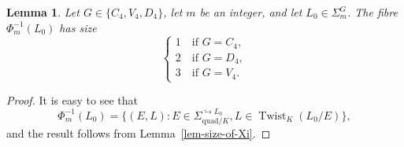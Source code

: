 \documentclass[11pt]{amsart}
\theoremstyle{theorem}
\newtheorem{lemma}[theorem]{Lemma}
\theoremstyle{example}
\theoremstyle{definition}
\numberwithin{theorem}{section}
\numberwithin{theorem}{section}
\DeclareMathOperator{\Twist}{Twist}
\newcommand{\quadr}{\mathrm{quad}}
\begin{document}
\begin{lemma}
    \label{lem-size-of-fibre-of-Phi_m}
    Let $G \in \{C_4, V_4, D_4\}$, let $m$ be an integer, and let $L_0 \in \Sigma_m^G$. The fibre $\Phi_m^{-1}(L_0)$ has size 
    $$
    \begin{cases}
        1\quad\text{if $G = C_4$},
        \\
        2\quad\text{if $G = D_4$},
        \\
        3 \quad\text{if $G = V_4$}. 
    \end{cases}
    $$
\end{lemma}
\begin{proof}
    It is easy to see that 
    $$
    \Phi_m^{-1}(L_0) = \{(E,L) : E \in \Sigma_{\quadr/K}^{\hookrightarrow L_0}, L \in \Twist_K(L_0/E)\},
    $$
    and the result follows from Lemma~\ref{lem-size-of-Xi}.
\end{proof}
\end{document}
